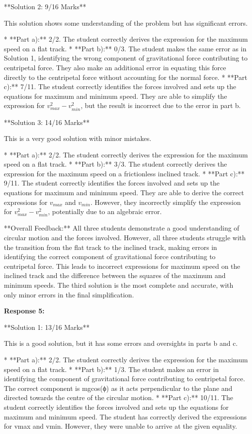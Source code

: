\documentclass[a4paper,11pt]{article}
\begin{document}
**Solution 2: 9/16 Marks**

This solution shows some understanding of the problem but has significant errors.

*   **Part a):** 2/2. The student correctly derives the expression for the maximum speed on a flat track.
*   **Part b):** 0/3. The student makes the same error as in Solution 1, identifying the wrong component of gravitational force contributing to centripetal force. They also make an additional error in equating this force directly to the centripetal force without accounting for the normal force.
*   **Part c):** 7/11. The student correctly identifies the forces involved and sets up the equations for maximum and minimum speed. They are able to simplify the expression for \(v^2_{max} - v^2_{min}\), but the result is incorrect due to the error in part b.

**Solution 3: 14/16 Marks**

This is a very good solution with minor mistakes.

*   **Part a):** 2/2. The student correctly derives the expression for the maximum speed on a flat track.
*   **Part b):** 3/3. The student correctly derives the expression for the maximum speed on a frictionless inclined track.
*   **Part c):** 9/11. The student correctly identifies the forces involved and sets up the equations for maximum and minimum speed. They are able to derive the correct expressions for \(v_{max}\) and \(v_{min}\). However, they incorrectly simplify the expression for \(v^2_{max} - v^2_{min}\), potentially due to an algebraic error.

**Overall Feedback:**
All three students demonstrate a good understanding of circular motion and the forces involved. However, all three students struggle with the transition from the flat track to the inclined track, making errors in identifying the correct component of gravitational force contributing to centripetal force. This leads to incorrect expressions for maximum speed on the inclined track and the difference between the squares of the maximum and minimum speeds. The third solution is the most complete and accurate, with only minor errors in the final simplification.

\textbf{Response 5:}

**Solution 1: 13/16 Marks**

This is a good solution, but it has some errors and oversights in parts b and c.

*   **Part a):** 2/2. The student correctly derives the expression for the maximum speed on a flat track.
*   **Part b):** 1/3. The student makes an error in identifying the component of gravitational force contributing to centripetal force. The correct component is  mgcos(ϕ)  as it acts perpendicular to the plane and directed towards the centre of the circular motion.
*   **Part c):** 10/11. The student correctly identifies the forces involved and sets up the equations for maximum and minimum speed.  The student has correctly derived the expressions for vmax and vmin. However, they were unable to arrive at the given equality.
\end{document}
